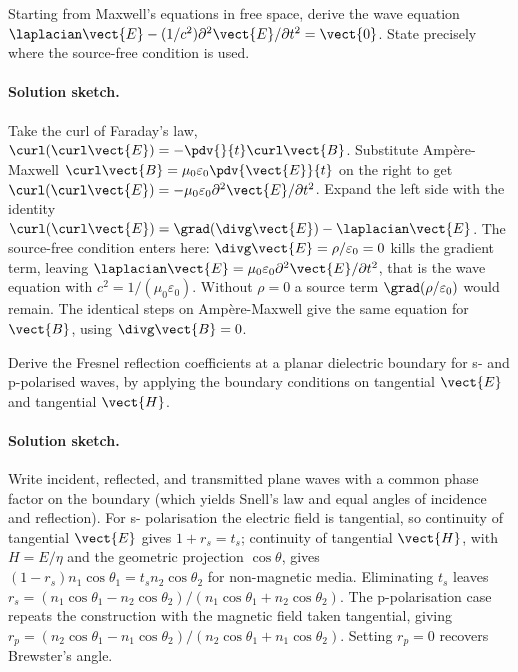 \begin{exercise}
Starting from Maxwell's equations in free space, derive the wave
equation $\laplacian \vect{E} - (1/c^{2})\partial^{2}\vect{E}/
\partial t^{2} = \vect{0}$. State precisely where the source-free
condition is used.
\paragraph{Solution sketch.} Take the curl of Faraday's law, $\curl
(\curl\vect{E}) = -\pdv{}{t}\curl\vect{B}$. Substitute Amp\`ere-Maxwell
$\curl\vect{B} = \mu_{0}\varepsilon_{0}\pdv{\vect{E}}{t}$ on the right
to get $\curl(\curl\vect{E}) = -\mu_{0}\varepsilon_{0}\partial^{2}
\vect{E}/\partial t^{2}$. Expand the left side with the identity
$\curl(\curl\vect{E}) = \grad(\divg\vect{E}) - \laplacian\vect{E}$. The
source-free condition enters here: $\divg\vect{E} = \rho/\varepsilon_{0}
= 0$ kills the gradient term, leaving $\laplacian\vect{E} = \mu_{0}
\varepsilon_{0}\partial^{2}\vect{E}/\partial t^{2}$, that is the wave
equation with $c^{2} = 1/(\mu_{0}
\varepsilon_{0})$. Without $\rho = 0$ a source term $\grad(\rho/
\varepsilon_{0})$ would remain. The identical steps on Amp\`ere-Maxwell
give the same equation for $\vect{B}$, using $\divg\vect{B} = 0$.
\end{exercise}

\begin{exercise}
Derive the Fresnel reflection coefficients at a planar dielectric
boundary for s- and p-polarised waves, by applying the boundary
conditions on tangential $\vect{E}$ and tangential $\vect{H}$.
\paragraph{Solution sketch.} Write incident, reflected, and transmitted
plane waves with a common phase factor on the boundary (which yields
Snell's law and equal angles of incidence and reflection). For s-
polarisation the electric field is tangential, so continuity of
tangential $\vect{E}$ gives $1 + r_{s} = t_{s}$; continuity of
tangential $\vect{H}$, with $H = E/\eta$ and the geometric projection
$\cos\theta$, gives $(1 - r_{s})n_{1}\cos\theta_{1} = t_{s}n_{2}\cos
\theta_{2}$ for non-magnetic media. Eliminating $t_{s}$ leaves $r_{s} =
(n_{1}\cos\theta_{1} - n_{2}\cos\theta_{2})/(n_{1}\cos\theta_{1} +
n_{2}\cos\theta_{2})$. The p-polarisation case repeats the construction
with the magnetic field taken tangential, giving $r_{p} = (n_{2}\cos
\theta_{1} - n_{1}\cos\theta_{2})/(n_{2}\cos\theta_{1} + n_{1}\cos
\theta_{2})$. Setting $r_{p} = 0$ recovers Brewster's angle.
\end{exercise}

